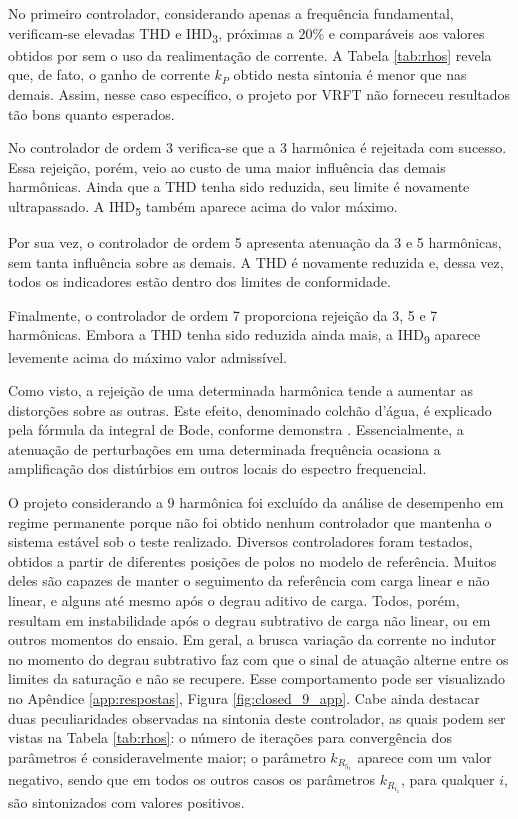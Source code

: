 \documentclass[repeatfields,oneside,overleaf]{tcc}
\begin{document}
No primeiro controlador, considerando apenas a frequência fundamental, verificam-se elevadas THD e IHD\textsubscript{3}, próximas a $20\%$ e comparáveis aos valores obtidos por \textcite{Corleta2016} sem o uso da realimentação de corrente.
A Tabela \ref{tab:rhos} revela que, de fato, o ganho de corrente $k_P$ obtido nesta sintonia é menor que nas demais.
Assim, nesse caso específico, o projeto por VRFT não forneceu resultados tão bons quanto esperados.

No controlador de ordem 3 verifica-se que a 3{\textordfeminine} harmônica é rejeitada com sucesso.
Essa rejeição, porém, veio ao custo de uma maior influência das demais harmônicas.
Ainda que a THD tenha sido reduzida, seu limite é novamente ultrapassado.
A IHD\textsubscript{5} também aparece acima do valor máximo.

Por sua vez, o controlador de ordem 5 apresenta atenuação da 3{\textordfeminine} e 5{\textordfeminine} harmônicas, sem tanta influência sobre as demais.
A THD é novamente reduzida e, dessa vez, todos os indicadores estão dentro dos limites de conformidade.

Finalmente, o controlador de ordem 7 proporciona rejeição da 3{\textordfeminine}, 5{\textordfeminine} e 7{\textordfeminine} harmônicas.
Embora a THD tenha sido reduzida ainda mais, a IHD\textsubscript{9} aparece levemente acima do máximo valor admissível.

Como visto, a rejeição de uma determinada harmônica tende a aumentar as distorções sobre as outras.
Este efeito, denominado colchão d'água, é explicado pela fórmula da integral de Bode, conforme demonstra \textcite{Bertoldi2019}.
Essencialmente, a atenuação de perturbações em uma determinada frequência ocasiona a amplificação dos distúrbios em outros locais do espectro frequencial.

O projeto considerando a 9{\textordfeminine} harmônica foi excluído da análise de desempenho em regime permanente porque não foi obtido nenhum controlador que mantenha o sistema estável sob o teste realizado.
Diversos controladores foram testados, obtidos a partir de diferentes posições de polos no modelo de referência.
Muitos deles são capazes de manter o seguimento da referência com carga linear e não linear, e alguns até mesmo após o degrau aditivo de carga.
Todos, porém, resultam em instabilidade após o degrau subtrativo de carga não linear, ou em outros momentos do ensaio.
Em geral, a brusca variação da corrente no indutor no momento do degrau subtrativo faz com que o sinal de atuação alterne entre os limites da saturação e não se recupere.
Esse comportamento pode ser visualizado no Apêndice \ref{app:respostas}, Figura \ref{fig:closed_9_app}.
Cabe ainda destacar duas peculiaridades observadas na sintonia deste controlador, as quais podem ser vistas na Tabela \ref{tab:rhos}:
o número de iterações para convergência dos parâmetros é consideravelmente maior;
o parâmetro $k_{R_{5_1}}$ aparece com um valor negativo, sendo que em todos os outros casos os parâmetros $k_{R_{i_1}}$, para qualquer $i$, são sintonizados com valores positivos.
\end{document}
